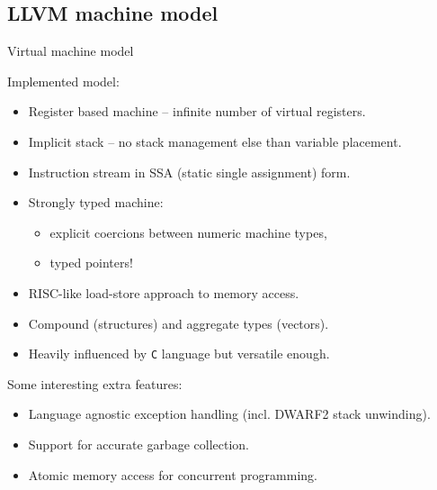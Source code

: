 \documentclass[8pt]{beamer}
\begin{document}
\subsection*{LLVM machine model}

\begin{frame}[fragile]{Virtual machine model}
  \begin{block}{Implemented model:}
    \begin{itemize}
      \item Register based machine -- infinite number of virtual registers.
      \item Implicit stack -- no stack management else than variable placement.
      \item Instruction stream in SSA (static single assignment) form.
      \item Strongly typed machine:
        \begin{itemize}
          \item explicit coercions between numeric machine types,
          \item typed pointers!
        \end{itemize}
      \item RISC-like load-store approach to memory access.
      \item Compound (structures) and aggregate types (vectors).
      \item Heavily influenced by \verb+C+ language but versatile enough.
    \end{itemize}
  \end{block}
  
  \begin{block}{Some interesting extra features:}
    \begin{itemize}
      \item Language agnostic exception handling (incl. DWARF2 stack unwinding).
      \item Support for accurate garbage collection.
      \item Atomic memory access for concurrent programming.
    \end{itemize}
  \end{block}
\end{frame}
\end{document}
